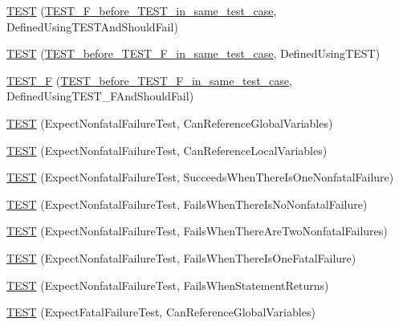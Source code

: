 \begin{DoxyCompactItemize}
\item 
\mbox{\hyperlink{googletest-output-test___8cc_a4b026b84b5a6dcbfa586f406e7c6b79c}{T\+E\+ST}} (\mbox{\hyperlink{classTEST__F__before__TEST__in__same__test__case}{T\+E\+S\+T\+\_\+\+F\+\_\+before\+\_\+\+T\+E\+S\+T\+\_\+in\+\_\+same\+\_\+test\+\_\+case}}, Defined\+Using\+T\+E\+S\+T\+And\+Should\+Fail)
\item 
\mbox{\hyperlink{googletest-output-test___8cc_a80bcd554d66913b961ad814266a403a8}{T\+E\+ST}} (\mbox{\hyperlink{classTEST__before__TEST__F__in__same__test__case}{T\+E\+S\+T\+\_\+before\+\_\+\+T\+E\+S\+T\+\_\+\+F\+\_\+in\+\_\+same\+\_\+test\+\_\+case}}, Defined\+Using\+T\+E\+ST)
\item 
\mbox{\hyperlink{googletest-output-test___8cc_aa0ba9be79b1b05ddadfc8d25c099df31}{T\+E\+S\+T\+\_\+F}} (\mbox{\hyperlink{classTEST__before__TEST__F__in__same__test__case}{T\+E\+S\+T\+\_\+before\+\_\+\+T\+E\+S\+T\+\_\+\+F\+\_\+in\+\_\+same\+\_\+test\+\_\+case}}, Defined\+Using\+T\+E\+S\+T\+\_\+\+F\+And\+Should\+Fail)
\item 
\mbox{\hyperlink{googletest-output-test___8cc_a3dd01f9996bd85dd50bd7632f58cbf8c}{T\+E\+ST}} (Expect\+Nonfatal\+Failure\+Test, Can\+Reference\+Global\+Variables)
\item 
\mbox{\hyperlink{googletest-output-test___8cc_afe7af77e310ee1a7599e2bc1f0f14354}{T\+E\+ST}} (Expect\+Nonfatal\+Failure\+Test, Can\+Reference\+Local\+Variables)
\item 
\mbox{\hyperlink{googletest-output-test___8cc_ac144593aa4a95ae47c0bb03def354f66}{T\+E\+ST}} (Expect\+Nonfatal\+Failure\+Test, Succeeds\+When\+There\+Is\+One\+Nonfatal\+Failure)
\item 
\mbox{\hyperlink{googletest-output-test___8cc_a3984cefae98995e99cc3de7251998c34}{T\+E\+ST}} (Expect\+Nonfatal\+Failure\+Test, Fails\+When\+There\+Is\+No\+Nonfatal\+Failure)
\item 
\mbox{\hyperlink{googletest-output-test___8cc_a17f835822727dac7b75b74ed70d2fbd2}{T\+E\+ST}} (Expect\+Nonfatal\+Failure\+Test, Fails\+When\+There\+Are\+Two\+Nonfatal\+Failures)
\item 
\mbox{\hyperlink{googletest-output-test___8cc_ab9c67cf52ef031fdf619d61283da1ca7}{T\+E\+ST}} (Expect\+Nonfatal\+Failure\+Test, Fails\+When\+There\+Is\+One\+Fatal\+Failure)
\item 
\mbox{\hyperlink{googletest-output-test___8cc_aa5976cbca1620f7fea18689a3cbf5333}{T\+E\+ST}} (Expect\+Nonfatal\+Failure\+Test, Fails\+When\+Statement\+Returns)
\item 
\mbox{\hyperlink{googletest-output-test___8cc_a4b06191d54fb76270da3d3dd497e62b6}{T\+E\+ST}} (Expect\+Fatal\+Failure\+Test, Can\+Reference\+Global\+Variables)

\end{DoxyCompactItemize}
